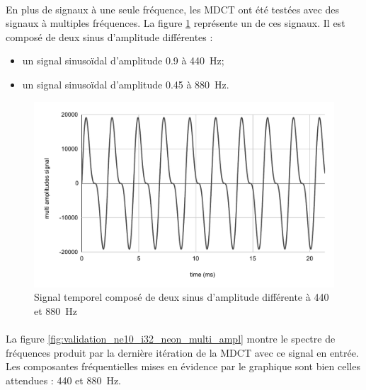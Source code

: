 \documentclass{article}
\begin{document}
    \paragraph{}
    En plus de signaux à une seule fréquence, les MDCT ont été testées avec des signaux à multiples fréquences. La figure \ref{fig:signal_multi_ampl} représente un de ces signaux. Il est composé de deux sinus d'amplitude différentes :
    \begin{itemize}
        \item un signal sinusoïdal d'amplitude \SI{0.9}{} à \SI{440}{\hertz};
        \item un signal sinusoïdal d'amplitude \SI{0.45}{} à \SI{880}{\hertz}.
    \end{itemize}
    \begin{figure}[H]
        \centering
        \includegraphics[width=.8\linewidth]{./images/signal_multi_ampl.pdf}
        \caption{Signal temporel composé de deux sinus d'amplitude différente à \SI{440}{} et \SI{880}{\hertz}}
        \label{fig:signal_multi_ampl}
    \end{figure}
    
    \paragraph{}
    La figure \ref{fig:validation_ne10_i32_neon_multi_ampl} montre le spectre de fréquences produit par la dernière itération de la MDCT avec ce signal en entrée. Les composantes fréquentielles mises en évidence par le graphique sont bien celles attendues : \SI{440}{} et \SI{880}{\hertz}.
\end{document}
